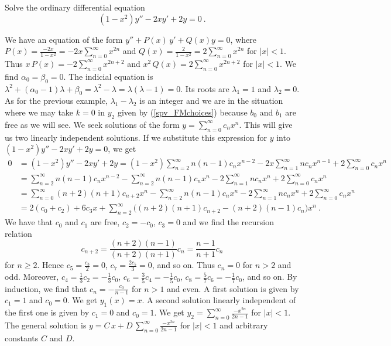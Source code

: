 \begin{egg}
Solve the ordinary differential equation
\[
(1-x^2)y''- 2x y' + 2y = 0 \ .
\]

We have an equation of the form
$\displaystyle y'' + P(x)\, y' + Q(x) y = 0$, where
$\displaystyle P(x) = \frac{-2x}{1-x^2} = -2x \sum_{n=0}^\infty x^{2n}$
and
$\displaystyle Q(x) = \frac{2}{1-x^2} = 2 \sum_{n=0}^\infty x^{2n}$
for $|x|<1$.  Thus
$\displaystyle x\,P(x) = -2 \sum_{n=0}^\infty x^{2n+2}$ and
$\displaystyle x^2\,Q(x) = 2\sum_{n=0}^\infty x^{2n+2}$
for $|x|<1$.  We find $\alpha_0 = \beta_0= 0$.  The indicial equation is
$\displaystyle \lambda^2 + (\alpha_0 - 1)\lambda + \beta_0 = \lambda^2
- \lambda  = \lambda (\lambda -1) = 0$.
Its roots are $\displaystyle \lambda_1 = 1$ and $\lambda_2=0$.
As for the previous example, $\lambda_1-\lambda_2$ is an integer and
we are in the situation where we may take $k=0$ in $y_2$ given by
(\ref{spv_FMchoices}) because $b_0$ and $b_1$ are free as we will see.
We seek solutions of the form
$\displaystyle y = \sum_{n=0}^\infty c_n x^n$.  This will give us
two linearly independent solutions.  If we substitute this
expression for $y$ into $\displaystyle (1-x^2)y''- 2x y' + 2y = 0$, we
get
\begin{align*}
0 & = (1-x^2)y''- 2x y' + 2y
= (1-x^2) \sum_{n=2}^\infty n(n-1) c_n
x^{n-2} - 2 x \sum_{n=1}^\infty n c_n x^{n-1}
+ 2 \sum_{n=0}^\infty c_n x^n \\
&= \sum_{n=2}^\infty n(n-1) c_n x^{n-2}
- \sum_{n=2}^\infty n(n-1) c_n x^n -2 \sum_{n=1}^\infty n c_n x^n
+ 2\sum_{n=0}^\infty c_n x^n \\
&= \sum_{n=0}^\infty (n+2)(n+1) c_{n+2} x^n
- \sum_{n=2}^\infty n(n-1) c_n x^n -2 \sum_{n=1}^\infty n c_n x^n
+ 2\sum_{n=0}^\infty c_n x^n \\
&= 2 (c_0+c_2) + 6 c_3 x + \sum_{n=2}^\infty \big( (n+2)(n+1) c_{n+2} 
- (n+2)(n-1) c_n \big) x^n \ .
\end{align*}
We have that $c_0$ and $c_1$ are free, $c_2 = -c_0$, $c_3 =0$ and we
find the recursion relation
\[
c_{n+2}  = \frac{(n+2)(n-1)}{(n+2)(n+1)} c_n = \frac{n-1}{n+1} c_n
\]
for $n\geq 2$.  Hence
$\displaystyle c_5 = \frac{c_3}{2} = 0$,
$\displaystyle c_7 = \frac{2c_5}{3} = 0$, and so on.
Thus $c_n = 0$ for $n>2$ and odd.  Moreover,
$\displaystyle c_4 = \frac{1}{3} c_2 = - \frac{1}{3} c_0$,
$\displaystyle c_6 = \frac{3}{5} c_4 = - \frac{1}{5} c_0$,
$\displaystyle c_8 = \frac{5}{7} c_6 = - \frac{1}{7} c_0$, and so on.
By induction, we find that
$\displaystyle c_n = - \frac{c_0}{n-1}$ for $n>1$ and even.
A first solution is given by $c_1=1$ and $c_0=0$.  We get
$y_1(x) = x$.  A second solution linearly independent of the first one
is given by $c_1=0$ and $c_0=1$.  We get
$\displaystyle y_2 = \sum_{n=0}^\infty \frac{-x^{2n}}{2n-1}$
for $|x|<1$.  The general solution is
$\displaystyle y = C\, x + D\,\sum_{n=0}^\infty \frac{-x^{2n}}{2n-1}$
for $|x|<1$ and arbitrary constants $C$ and $D$.
\end{egg}

